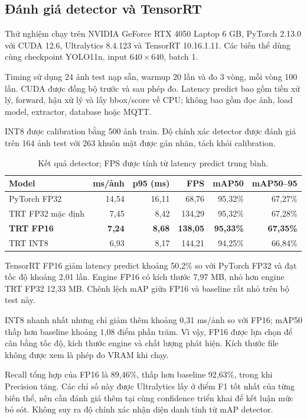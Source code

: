 \documentclass[11pt,a4paper]{article}
\begin{document}
\subsection{Đánh giá detector và TensorRT}
Thử nghiệm chạy trên NVIDIA GeForce RTX 4050 Laptop 6 GB, PyTorch 2.13.0 với CUDA 12.6, Ultralytics 8.4.123 và TensorRT 10.16.1.11. Các biến thể dùng cùng checkpoint YOLO11n, input $640\times640$, batch 1.

Timing sử dụng 24 ảnh test nạp sẵn, warmup 20 lần và đo 3 vòng, mỗi vòng 100 lần. CUDA được đồng bộ trước và sau phép đo. Latency predict bao gồm tiền xử lý, forward, hậu xử lý và lấy bbox/score về CPU; không bao gồm đọc ảnh, load model, extractor, database hoặc MQTT.

INT8 được calibration bằng 500 ảnh train. Độ chính xác detector được đánh giá trên 164 ảnh test với 263 khuôn mặt được gán nhãn, tách khỏi calibration.

\begin{table}[ht]
\centering\small
\begin{tabular}{@{}lrrrrr@{}}
\toprule
Model & ms/ảnh & p95 (ms) & FPS & mAP50 & mAP50--95\\
\midrule
PyTorch FP32 & 14,54 & 16,11 & 68,76 & 95,32\% & 67,27\%\\
TRT FP32 mặc định & 7,45 & 8,42 & 134,29 & 95,32\% & 67,28\%\\
\textbf{TRT FP16} & \textbf{7,24} & \textbf{8,68} & \textbf{138,05} & \textbf{95,33\%} & \textbf{67,35\%}\\
TRT INT8 & 6,93 & 8,17 & 144,21 & 94,25\% & 66,84\%\\
\bottomrule
\end{tabular}
\caption{Kết quả detector; FPS được tính từ latency predict trung bình.}
\end{table}

TensorRT FP16 giảm latency predict khoảng 50,2\% so với PyTorch FP32 và đạt tốc độ khoảng 2,01 lần. Engine FP16 có kích thước 7,97 MB, nhỏ hơn engine TRT FP32 12,33 MB. Chênh lệch mAP giữa FP16 và baseline rất nhỏ trên bộ test này.

INT8 nhanh nhất nhưng chỉ giảm thêm khoảng 0,31 ms/ảnh so với FP16; mAP50 thấp hơn baseline khoảng 1,08 điểm phần trăm. Vì vậy, FP16 được lựa chọn để cân bằng tốc độ, kích thước engine và chất lượng phát hiện. Kích thước file không được xem là phép đo VRAM khi chạy.

Recall tổng hợp của FP16 là 89,46\%, thấp hơn baseline 92,63\%, trong khi Precision tăng. Các chỉ số này được Ultralytics lấy ở điểm F1 tốt nhất của từng biến thể, nên cần đánh giá thêm tại cùng confidence triển khai để kết luận mức bỏ sót. Không suy ra độ chính xác nhận diện danh tính từ mAP detector.
\end{document}
